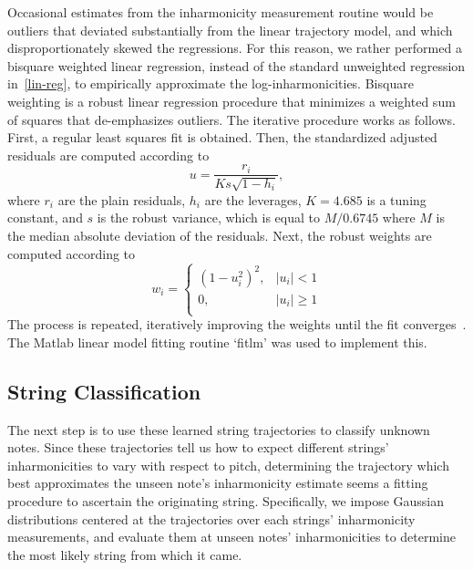 \documentclass[12pt]{cmuthesis}
\begin{document}
Occasional estimates from the inharmonicity measurement routine would be outliers that deviated substantially from the linear trajectory model, and which disproportionately skewed the regressions. For this reason, we rather performed a bisquare weighted linear regression, instead of the standard unweighted regression in~\eqref{lin-reg}, to empirically approximate the log-inharmonicities. Bisquare weighting is a robust linear regression procedure that minimizes a weighted sum of squares that de-emphasizes outliers. The iterative procedure works as follows. First, a regular least squares fit is obtained. Then, the standardized adjusted residuals are computed according to
\begin{equation}
u = \frac{r_i}{Ks\sqrt{1-h_i}},
\end{equation}
where $r_i$ are the plain residuals, $h_i$ are the leverages, $K = 4.685$ is a tuning constant, and $s$ is the robust variance, which is equal to $M/0.6745$ where $M$ is the median absolute deviation of the residuals. Next, the robust weights are computed according to
\begin{equation}
w_i = \begin{cases}
(1-u_i^2)^2, & |u_i| < 1\\
0, & |u_i| \geq 1\\
\end{cases}
\end{equation} 
The process is repeated, iteratively improving the weights until the fit converges~\cite{matlab-robustfit}. The Matlab linear model fitting routine `fitlm' was used to implement this.

\subsection{String Classification}
\label{sec:string-classification}
The next step is to use these learned string trajectories to classify unknown notes. Since these trajectories tell us how to expect different strings' inharmonicities to vary with respect to pitch, determining the trajectory which best approximates the unseen note's inharmonicity estimate seems a fitting procedure to ascertain the originating string. Specifically, we impose Gaussian distributions centered at the trajectories over each strings' inharmonicity measurements, and evaluate them at unseen notes' inharmonicities to determine the most likely string from which it came.
\end{document}
